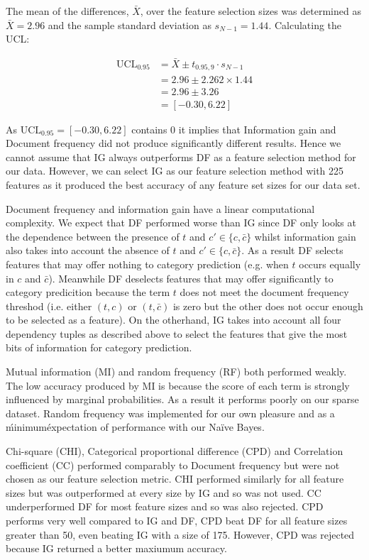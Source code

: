 \documentclass[10pt, a4paper]{article}
\begin{document}
The mean of the differences, $\bar{X}$, over the feature selection sizes was determined as $\bar{X} = 2.96$ and the sample standard deviation as $s_{N-1} = 1.44$. Calculating the UCL:

\begin{align*}
\text{UCL}_{0.95} &= \bar{X} \pm t_{0.95,9} \cdot s_{N-1} \\
  &= 2.96 \pm 2.262 \times 1.44 \\
  &= 2.96 \pm 3.26 \\
  &= [-0.30, 6.22]
\end{align*}

As $\text{UCL}_{0.95} = [-0.30, 6.22]$ contains 0 it implies that Information gain and Document frequency did not produce significantly different results. Hence we cannot assume that IG always outperforms DF as a feature selection method for our data. However, we can select IG as our feature selection method with 225 features as it produced the best accuracy of any feature set sizes for our data set.

Document frequency and information gain have a linear computational complexity. We expect that DF performed worse than IG since DF only looks at the dependence between the presence of $t$ and $c' \in \{c,\bar{c}\}$ whilst information gain also takes into account the absence of $t$ and $c' \in \{c,\bar{c}\}$. As a result DF selects features that may offer nothing to category prediction (e.g. when $t$ occurs equally in $c$ and $\bar{c}$). Meanwhile DF deselects features that may offer significantly to category predicition because the term $t$ does not meet the document frequency threshod (i.e. either $(t,c)$ or $(t,\bar{c})$ is zero but the other does not occur enough to be selected as a feature). On the otherhand, IG takes into account all four dependency tuples as described above to select the features that give the most bits of information for category prediction.

Mutual information (MI) and random frequency (RF) both performed weakly. The low accuracy produced by MI is because the score of each term is strongly influenced by marginal probabilities. As a result it performs poorly on our sparse dataset. Random frequency was implemented for our own pleasure and as a \'minimum\' expectation of performance with our Na\"ive Bayes. 

 Chi-square (CHI), Categorical proportional difference (CPD) and Correlation coefficient (CC) performed comparably to Document frequency but were not chosen as our feature selection metric. CHI performed similarly for all feature sizes but was outperformed at every size by IG and so was not used. CC underperformed DF for most feature sizes and so was also rejected. CPD performs very well compared to IG and DF, CPD beat DF for all feature sizes greater than 50, even beating IG with a size of 175. However, CPD was rejected because IG returned a better maxiumum accuracy. 
\end{document}
